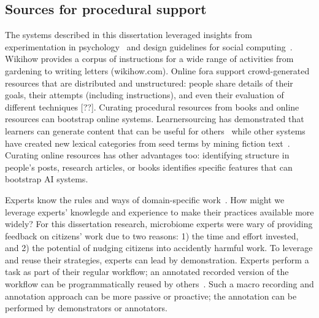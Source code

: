\subsection{Sources for procedural support}
The systems described in this dissertation leveraged insights from experimentation in psychology~\cite{Martin2007} and design guidelines for social computing~\cite{Resnick2011}. Wikihow provides a corpus of instructions for a wide range of activities from gardening to writing letters (wikihow.com). Online fora support crowd-generated resources that are distributed and unstructured: people share details of their goals, their attempts (including instructions), and even their evaluation of different techniques [??]. Curating procedural resources from books and online resources can bootstrap online systems. Learnersourcing has demonstrated that learners can generate content that can be useful for others~\cite{Kim2015f} while other systems have created new lexical categories from seed terms by mining fiction text~\cite{fast2016empath}. Curating online resources has other advantages too: identifying structure in people's posts, research articles, or books identifies specific features that can bootstrap AI systems.

Experts know the rules and ways of domain-specific work~\cite{Francis2006}. How might we leverage experts' knowlegde and experience to make their practices available more widely? For this dissertation research, microbiome experts were wary of providing feedback on citizens' work due to two reasons: 1) the time and effort invested, and 2) the potential of nudging citizens into accidently harmful work. To leverage and reuse their strategies, experts can lead by demonstration. Experts perform a task as part of their regular workflow; an annotated recorded version of the workflow can be programmatically reused by others~\cite{cypher1993watch}. Such a macro recording and annotation approach can be more passive or proactive; the annotation can be performed by demonstrators or annotators.




